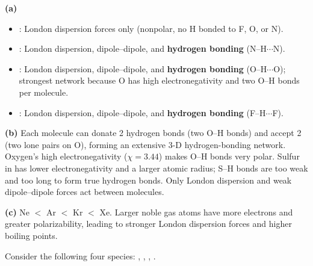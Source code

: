 \documentclass[addpoints]{exam}
\begin{document}
\begin{questions}
\begin{solution}[9cm]
\textbf{(a)}
\begin{itemize}
    \item {}: London dispersion forces only (nonpolar, no H bonded to F, O, or N).
    \item {}: London dispersion, dipole--dipole, and \textbf{hydrogen bonding}
    (N--H$\cdots$N).
    \item {}: London dispersion, dipole--dipole, and \textbf{hydrogen bonding}
    (O--H$\cdots$O); strongest network because O has high electronegativity and two O--H bonds per
    molecule.
    \item {}: London dispersion, dipole--dipole, and \textbf{hydrogen bonding}
    (F--H$\cdots$F).
\end{itemize}

\textbf{(b)} Each  molecule can donate 2 hydrogen bonds (two O--H bonds) and accept 2
(two lone pairs on O), forming an extensive 3-D hydrogen-bonding network. Oxygen's high
electronegativity ($\chi = 3.44$) makes O--H bonds very polar. Sulfur in  has lower
electronegativity and a larger atomic radius; S--H bonds are too weak and too long to form true
hydrogen bonds. Only London dispersion and weak dipole--dipole forces act between 
molecules.

\textbf{(c)} Ne $<$ Ar $<$ Kr $<$ Xe. Larger noble gas atoms have more electrons and greater
polarizability, leading to stronger London dispersion forces and higher boiling points.
\end{solution}

\question Consider the following four species: , , , .
\end{questions}
\end{document}
